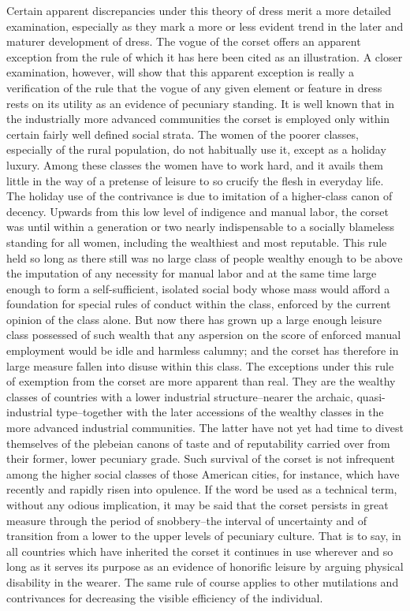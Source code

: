 \documentclass[12pt]{report}
\begin{document}
Certain apparent discrepancies under this theory of dress merit a more
detailed examination, especially as they mark a more or less evident
trend in the later and maturer development of dress. The vogue of the
corset offers an apparent exception from the rule of which it has here
been cited as an illustration. A closer examination, however, will show
that this apparent exception is really a verification of the rule that
the vogue of any given element or feature in dress rests on its utility
as an evidence of pecuniary standing. It is well known that in the
industrially more advanced communities the corset is employed only
within certain fairly well defined social strata. The women of the
poorer classes, especially of the rural population, do not habitually
use it, except as a holiday luxury. Among these classes the women have
to work hard, and it avails them little in the way of a pretense of
leisure to so crucify the flesh in everyday life. The holiday use of
the contrivance is due to imitation of a higher-class canon of decency.
Upwards from this low level of indigence and manual labor, the corset
was until within a generation or two nearly indispensable to a socially
blameless standing for all women, including the wealthiest and most
reputable. This rule held so long as there still was no large class of
people wealthy enough to be above the imputation of any necessity
for manual labor and at the same time large enough to form a
self-sufficient, isolated social body whose mass would afford a
foundation for special rules of conduct within the class, enforced by
the current opinion of the class alone. But now there has grown up a
large enough leisure class possessed of such wealth that any aspersion
on the score of enforced manual employment would be idle and harmless
calumny; and the corset has therefore in large measure fallen into
disuse within this class. The exceptions under this rule of exemption
from the corset are more apparent than real. They are the wealthy
classes of countries with a lower industrial structure--nearer the
archaic, quasi-industrial type--together with the later accessions of
the wealthy classes in the more advanced industrial communities. The
latter have not yet had time to divest themselves of the plebeian canons
of taste and of reputability carried over from their former, lower
pecuniary grade. Such survival of the corset is not infrequent among the
higher social classes of those American cities, for instance, which
have recently and rapidly risen into opulence. If the word be used as a
technical term, without any odious implication, it may be said that the
corset persists in great measure through the period of snobbery--the
interval of uncertainty and of transition from a lower to the upper
levels of pecuniary culture. That is to say, in all countries which
have inherited the corset it continues in use wherever and so long as
it serves its purpose as an evidence of honorific leisure by arguing
physical disability in the wearer. The same rule of course applies to
other mutilations and contrivances for decreasing the visible efficiency
of the individual.
\end{document}
